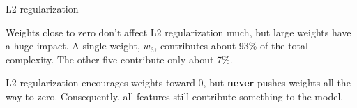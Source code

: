 \begin{frame}{L2 regularization}
  \begin{withmargin}
    \begin{tdmargin}
      Weights close to zero don't affect L2 regularization much, but large
      weights have a huge impact. A single weight, $w_3$, contributes about 93\%
      of the total complexity. The other five contribute only about 7\%.
      \par\medskip
      L2 regularization encourages weights toward 0, but \textbf{never} pushes
      weights all the way to zero. Consequently, all features still contribute
      something to the model.
    \end{tdmargin}
  \end{withmargin}
\end{frame}

